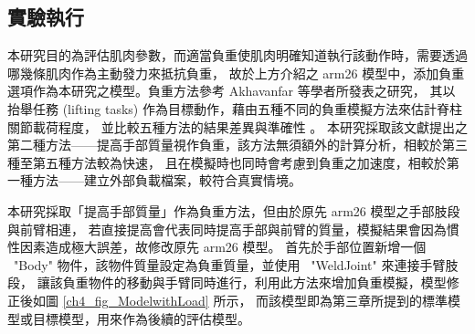 \subsection{實驗執行}
本研究目的為評估肌肉參數，而適當負重使肌肉明確知道執行該動作時，需要透過哪幾條肌肉作為主動發力來抵抗負重，
故於上方介紹之 arm26 模型中，添加負重選項作為本研究之模型。負重方法參考 Akhavanfar 等學者所發表之研究，
其以抬舉任務 (lifting tasks) 作為目標動作，藉由五種不同的負重模擬方法來估計脊柱關節載荷程度，
並比較五種方法的結果差異與準確性 \cite{akhavanfar2022sharing}。
本研究採取該文獻提出之第二種方法——提高手部質量視作負重，該方法無須額外的計算分析，相較於第三種至第五種方法較為快速，
且在模擬時也同時會考慮到負重之加速度，相較於第一種方法——建立外部負載檔案，較符合真實情境。

本研究採取「提高手部質量」作為負重方法，但由於原先 arm26 模型之手部肢段與前臂相連，
若直接提高會代表同時提高手部與前臂的質量，模擬結果會因為慣性因素造成極大誤差，故修改原先 arm26 模型。
首先於手部位置新增一個 \ "Body" 物件，該物件質量設定為負重質量，並使用 \ "WeldJoint" 來連接手臂肢段，
讓該負重物件的移動與手臂同時進行，利用此方法來增加負重模擬，模型修正後如圖 \ref{ch4_fig_ModelwithLoad} 所示，
而該模型即為第三章所提到的標準模型或目標模型，用來作為後續的評估模型。

\clearpage

